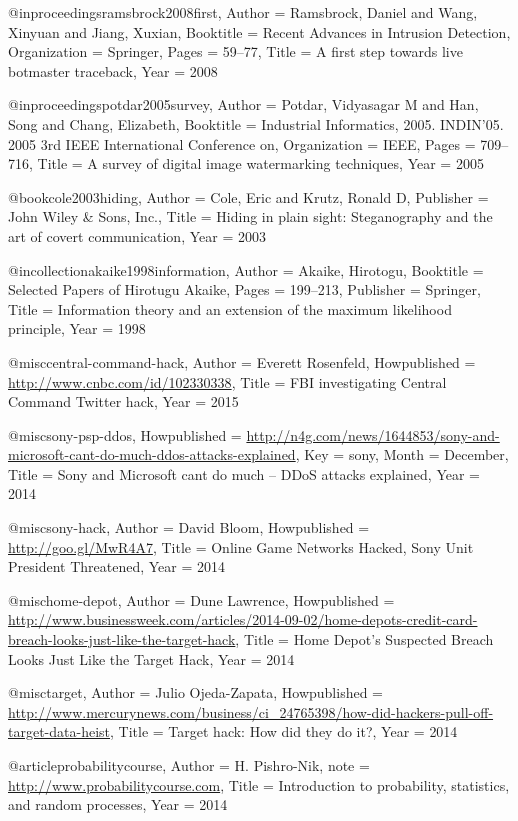 {{@inproceedings{ramsbrock2008first,
	Author = {Ramsbrock, Daniel and Wang, Xinyuan and Jiang, Xuxian},
	Booktitle = {Recent Advances in Intrusion Detection},
	Organization = {Springer},
	Pages = {59--77},
	Title = {A first step towards live botmaster traceback},
	Year = {2008}}

@inproceedings{potdar2005survey,
	Author = {Potdar, Vidyasagar M and Han, Song and Chang, Elizabeth},
	Booktitle = {Industrial Informatics, 2005. INDIN'05. 2005 3rd IEEE International Conference on},
	Organization = {IEEE},
	Pages = {709--716},
	Title = {A survey of digital image watermarking techniques},
	Year = {2005}}

@book{cole2003hiding,
	Author = {Cole, Eric and Krutz, Ronald D},
	Publisher = {John Wiley \& Sons, Inc.},
	Title = {Hiding in plain sight: Steganography and the art of covert communication},
	Year = {2003}}

@incollection{akaike1998information,
	Author = {Akaike, Hirotogu},
	Booktitle = {Selected Papers of Hirotugu Akaike},
	Pages = {199--213},
	Publisher = {Springer},
	Title = {Information theory and an extension of the maximum likelihood principle},
	Year = {1998}}

@misc{central-command-hack,
	Author = {Everett Rosenfeld},
	Howpublished = {\url{http://www.cnbc.com/id/102330338}},
	Title = {{FBI investigating Central Command Twitter hack}},
	Year = {2015}}

@misc{sony-psp-ddos,
	Howpublished = {\url{http://n4g.com/news/1644853/sony-and-microsoft-cant-do-much-ddos-attacks-explained}},
	Key = {sony},
	Month = {December},
	Title = {{Sony and Microsoft cant do much -- DDoS attacks explained}},
	Year = {2014}}

@misc{sony-hack,
	Author = {David Bloom},
	Howpublished = {\url{http://goo.gl/MwR4A7}},
	Title = {{Online Game Networks Hacked, Sony Unit President Threatened}},
	Year = {2014}}

@misc{home-depot,
	Author = {Dune Lawrence},
	Howpublished = {\url{http://www.businessweek.com/articles/2014-09-02/home-depots-credit-card-breach-looks-just-like-the-target-hack}},
	Title = {{Home Depot's Suspected Breach Looks Just Like the Target Hack}},
	Year = {2014}}

@misc{target,
	Author = {Julio Ojeda-Zapata},
	Howpublished = {\url{http://www.mercurynews.com/business/ci_24765398/how-did-hackers-pull-off-target-data-heist}},
	Title = {{Target hack: How did they do it?}},
	Year = {2014}}


@article{probabilitycourse,
	Author = {H. Pishro-Nik},
	note = {\url{http://www.probabilitycourse.com}},
	Title = {Introduction to probability, statistics, and random processes},
    Year = {2014}}

}}
